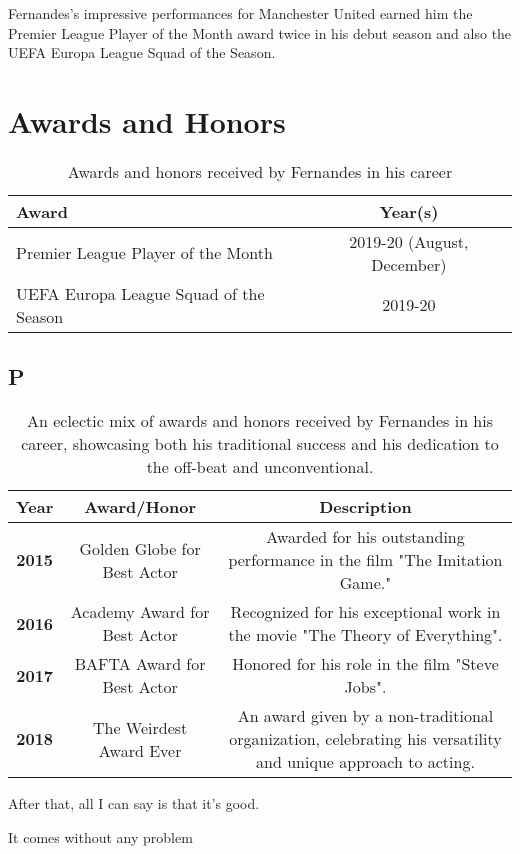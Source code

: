 \documentclass{article}
\begin{document}
   Fernandes's impressive performances for Manchester United earned him the Premier League Player of the Month award twice in his debut season and also the UEFA Europa League Squad of the Season.

   \section*{Awards and Honors}
   \begin{table}[h]
      \centering
      \begin{tabular}{|l|c|}
         \hline
         \textbf{Award} & \textbf{Year(s)} \\ \hline
         Premier League Player of the Month & 2019-20 (August, December) \\
         UEFA Europa League Squad of the Season & 2019-20 \\
         \hline
      \end{tabular}
      \caption*{Awards and honors received by Fernandes in his career}
   \label{tab:awards_honors}
   \end{table}

\subsection{P}

 \begin{table}[h!]
      \centering
      \begin{tabular}{ |c|c|c| }
        \hline
         \textbf{Year} & \textbf{Award/Honor} & \textbf{Description} \\
        \hline
        \textbf{2015} & Golden Globe for Best Actor & Awarded for his outstanding performance in the film "The Imitation Game." \\
        \textbf{2016} & Academy Award for Best Actor & Recognized for his exceptional work in the movie "The Theory of Everything". \\
        \textbf{2017} & BAFTA Award for Best Actor & Honored for his role in the film "Steve Jobs". \\
        \textbf{2018} & The Weirdest Award Ever & An award given by a non-traditional organization, celebrating his versatility and unique approach to acting. \\
        \hline
      \end{tabular}
      \caption*{An eclectic mix of awards and honors received by Fernandes in his career, showcasing both his traditional success and his dedication to the off-beat and unconventional.}
   \label{tab:awards_honors_weird}
   \end{table}

After that, all I can say is that it's good.



It comes without any problem

   
\end{document}
